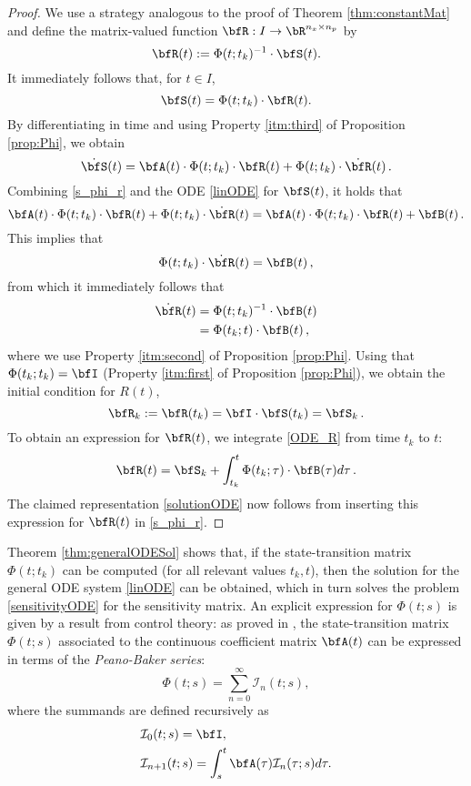 \documentclass[DIV=12]{scrartcl} %
\theoremstyle{definition}
\begin{document}
\begin{proof}
We use a strategy analogous to the proof of Theorem \ref{thm:constantMat} and define the matrix-valued function $\bfR:I \to \bR ^{n_x \times n_p}$ by
    \begin{equation}
        \label{def_R}
        \bfR(t):=\Phi(t;t_k)^{-1}\cdot \bfS(t).
    \end{equation}
    It immediately follows that, for $t \in I$,
    \begin{equation}
    \label{s_phi_r}
        \bfS(t)=\Phi(t;t_k)\cdot \bfR(t).
    \end{equation}
By differentiating in time and using Property \ref{itm:third} of Proposition \ref{prop:Phi}, we obtain
    \[
    \dot{\bfS}(t)=\bfA(t)\cdot\Phi(t;t_k)\cdot \bfR(t)+\Phi(t;t_k)\cdot \dot{\bfR}(t)\,.
    \]
  Combining \eqref{s_phi_r} and the ODE \eqref{linODE} for $\bfS (t)$, it holds that 
    \[
    \bfA(t)\cdot\Phi(t;t_k)\cdot \bfR(t)+\Phi(t;t_k)\cdot \dot{\bfR}(t)=\bfA(t)\cdot \Phi(t;t_k)\cdot \bfR(t)+\bfB(t)\,.
    \]
    This implies that 
    \[\Phi(t;t_k)\cdot \dot{\bfR}(t)=\bfB(t)\,,
    \]
    from which it immediately follows that
    \begin{equation}
      \begin{split}
        \dot{\bfR}(t)&=\Phi(t;t_k)^{-1}\cdot \bfB(t) \\
        &= \Phi(t_k;t)\cdot \bfB(t)\,,
      \end{split}\label{ODE_R}
    \end{equation}
    where we use Property \ref{itm:second} of Proposition \ref{prop:Phi}.
    Using that $\Phi(t_k;t_k) = \bfI$ (Property \ref{itm:first} of Proposition \ref{prop:Phi}), we obtain the initial condition for $R(t)$, 
    \[
    \bfR_k:=\bfR(t_k)=\bfI\cdot \bfS(t_k)=\bfS_k\,.
    \]
    To obtain an expression for $\bfR (t)$, we integrate \eqref{ODE_R} from time $t_k$ to $t$: 
    \[
    \bfR(t) = \bfS_k + \int_{t_k}^t\Phi(t_k;\tau)\cdot \bfB(\tau)d\tau\,.
    \]
    The claimed representation \eqref{solutionODE} now follows from inserting this expression for $\bfR (t)$ in \eqref{s_phi_r}. 
\end{proof}

Theorem \ref{thm:generalODESol} shows that, if the state-transition matrix $\Phi(t;t_k)$ can be computed (for all relevant values $t_k, t$), then the solution for the general ODE system \eqref{linODE} can be obtained, which in turn solves the problem \eqref{sensitivityODE} for the sensitivity matrix. An explicit expression for $\Phi(t;s)$ is given by a result from control theory: as proved in \cite{PeanoBaker}, the state-transition matrix $\Phi(t;s)$ associated to the continuous coefficient matrix $\bfA(t)$ can be expressed in terms of the \textit{Peano-Baker series}:
\begin{equation}
\label{PBS}
    \Phi(t;s) = \sum_{n=0}^{\infty}\mathcal{I}_n(t;s),
\end{equation}
where the summands are defined recursively as
\begin{align}
    & \mathcal{I}_0(t;s)=\bfI, \nonumber\\
    & \mathcal{I}_{n+1}(t;s) = \int_{s}^t\bfA(\tau)\mathcal{I}_n(\tau;s)d\tau. \label{recursiveTerm}
\end{align}
\end{document}
